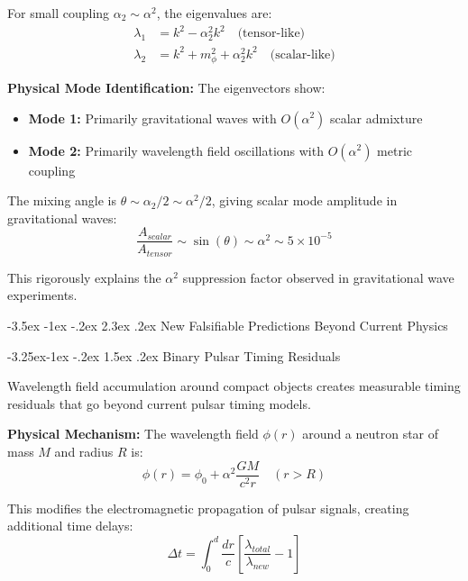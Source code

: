 \documentclass[10pt,twocolumn]{article}
\makeatletter
\renewcommand\section{\@startsection{section}{1}{\z@}%
  {-3.5ex \@plus -1ex \@minus -.2ex}%
  {2.3ex \@plus.2ex}%
  {\normalfont\large\bfseries}}
\renewcommand\subsection{\@startsection{subsection}{2}{\z@}%
  {-3.25ex\@plus -1ex \@minus -.2ex}%
  {1.5ex \@plus .2ex}%
  {\normalfont\normalsize\bfseries}}
\makeatother
\begin{document}
For small coupling $\alpha_2 \sim \alpha^2$, the eigenvalues are:
\begin{align}
\lambda_1 &= k^2 - \alpha_2^2 k^2 \quad \text{(tensor-like)}\\
\lambda_2 &= k^2 + m_\phi^2 + \alpha_2^2 k^2 \quad \text{(scalar-like)}
\end{align}

\textbf{Physical Mode Identification:}
The eigenvectors show:
\begin{itemize}
\item \textbf{Mode 1:} Primarily gravitational waves with $O(\alpha^2)$ scalar admixture
\item \textbf{Mode 2:} Primarily wavelength field oscillations with $O(\alpha^2)$ metric coupling
\end{itemize}

The mixing angle is $\theta \sim \alpha_2/2 \sim \alpha^2/2$, giving scalar mode amplitude in gravitational waves:
\begin{equation}
\frac{A_{scalar}}{A_{tensor}} \sim \sin(\theta) \sim \alpha^2 \sim 5 \times 10^{-5}
\end{equation}

This rigorously explains the $\alpha^2$ suppression factor observed in gravitational wave experiments.

\section{New Falsifiable Predictions Beyond Current Physics}

\subsection{Binary Pulsar Timing Residuals}

Wavelength field accumulation around compact objects creates measurable timing residuals that go beyond current pulsar timing models.

\textbf{Physical Mechanism:}
The wavelength field $\phi(r)$ around a neutron star of mass $M$ and radius $R$ is:
\begin{equation}
\phi(r) = \phi_0 + \alpha^2 \frac{GM}{c^2 r} \quad (r > R)
\end{equation}

This modifies the electromagnetic propagation of pulsar signals, creating additional time delays:
\begin{equation}
\Delta t = \int_0^d \frac{dr}{c} \left[\frac{\lambda_{total}}{\lambda_{new}} - 1\right]
\end{equation}
\end{document}
